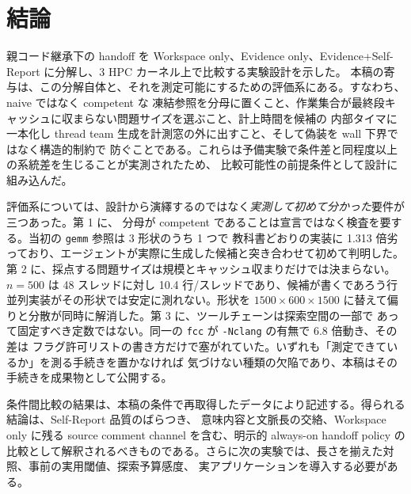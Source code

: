 \documentclass[conference,letterpaper]{IEEEtran}
\newcommand{\armW}{Workspace only}
\newcommand{\armE}{Evidence only}
\newcommand{\armS}{Evidence+Self-Report}
\begin{document}
\balance
\section{結論}
親コード継承下の handoff を \armW{}、\armE{}、\armS{} に分解し、3 HPC カーネル上で比較する実験設計を示した。
本稿の寄与は、この分解自体と、それを測定可能にするための評価系にある。すなわち、naive ではなく competent な
凍結参照を分母に置くこと、作業集合が最終段キャッシュに収まらない問題サイズを選ぶこと、計上時間を候補の
内部タイマに一本化し thread team 生成を計測窓の外に出すこと、そして偽装を wall 下界ではなく構造的制約で
防ぐことである。これらは予備実験で条件差と同程度以上の系統差を生じることが実測されたため、
比較可能性の前提条件として設計に組み込んだ。

評価系については、設計から演繹するのではなく\emph{実測して初めて分かった}要件が三つあった。第 1 に、
分母が competent であることは宣言ではなく検査を要する。当初の \texttt{gemm} 参照は 3 形状のうち 1 つで
教科書どおりの実装に 1.313 倍劣っており、エージェントが実際に生成した候補と突き合わせて初めて判明した。
第 2 に、採点する問題サイズは規模とキャッシュ収まりだけでは決まらない。$n=500$ は 48 スレッドに対し
10.4 行/スレッドであり、候補が書くであろう行並列実装がその形状では安定に測れない。形状を
$1500\times600\times1500$ に替えて偏りと分散が同時に解消した。第 3 に、ツールチェーンは探索空間の一部で
あって固定すべき定数ではない。同一の \texttt{fcc} が \texttt{-Nclang} の有無で 6.8 倍動き、その差は
フラグ許可リストの書き方だけで塞がれていた。いずれも「測定できているか」を測る手続きを置かなければ
気づけない種類の欠陥であり、本稿はその手続きを成果物として公開する。

条件間比較の結果は、本稿の条件で再取得したデータにより記述する。得られる結論は、Self-Report 品質のばらつき、
意味内容と文脈長の交絡、\armW{} に残る source comment channel を含む、明示的 always-on handoff policy の
比較として解釈されるべきものである。さらに次の実験では、長さを揃えた対照、事前の実用閾値、探索予算感度、
実アプリケーションを導入する必要がある。
\end{document}
